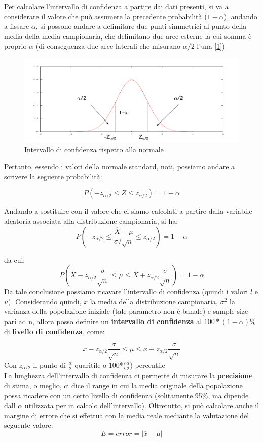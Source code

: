 Per calcolare l'intervallo di confidenza a partire dai dati presenti, si va a considerare il valore che può assumere la precedente probabilità (\(1-\alpha\)), andando a fissare \(\alpha\), si possono andare a delimitare due punti simmetrici al punto della media della media campionaria, che delimitano due aree esterne la cui somma è proprio \(\alpha\) (di conseguenza due aree laterali che misurano \(\alpha/2\) l'una [\ref{img:gaussian-confidence}])

\begin{figure}[h]
\centering
\includegraphics[width=.7\textwidth]{img/chapter-4/gaussain-confidence.png}
\caption{Intervallo di confidenza rispetto alla normale}\label{img:gaussian-confidence}
\end{figure}

Pertanto, essendo i valori della normale standard, noti, possiamo andare a scrivere la seguente probabilità:

\[
P(-z_{\alpha/2} \leq Z \leq z_{\alpha/2}) = 1 - \alpha
\]

Andando a sostituire con il valore che ci siamo calcolati a partire dalla variabile aleatoria associata alla distribuzione campionaria, si ha:
\[
P(-z_{\alpha/2} \leq \frac{\overline{X} - \mu}{\sigma/\sqrt{n}} \leq z_{\alpha/2}) = 1 - \alpha
\]

da cui:
\[
P\left (\overline{X} - z_{\alpha/2}\frac{\sigma}{\sqrt{n}} \leq \mu \leq \overline{X} + z_{\alpha/2}\frac{\sigma}{\sqrt{n}} \right ) = 1 - \alpha
\]
Da tale conclusione possiamo ricavare l'intervallo di confidenza (quindi i valori \(l\) e \(u\)).
Considerando quindi, \(\overline{x}\) la media della distribuzione campionaria, \(\sigma^2\) la varianza della popolazione iniziale (tale parametro non è banale) e sample size pari ad n, allora posso definire un \textbf{intervallo di confidenza} al \(100*(1-\alpha)\%\) di \textbf{livello di confidenza}, come: 

\[
\overline{x} - z_{\alpha/2}\frac{\sigma}{\sqrt{n}} \leq \mu \leq \overline{x} + z_{\alpha/2}\frac{\sigma}{\sqrt{n}}
\]
Con \(z_{\alpha/2}\) il punto di \(\frac{\alpha}{2}\)-quaritile o 100*(\(\frac{\alpha}{2}\))-percentile
\\
La lunghezza dell'intervallo di confidenza ci permette di misurare la \textbf{precisione} di stima, o meglio, ci dice il range in cui la media originale della popolazione possa ricadere con un certo livello di confidenza (solitamente 95\%, ma dipende dall \(\alpha\) utilizzata per in calcolo dell'intervallo).
Oltretutto, si può calcolare anche il margine di errore che si effettua con la media reale mediante la valutazione del seguente valore:
\[
E = error = |\overline{x} - \mu|
\]

